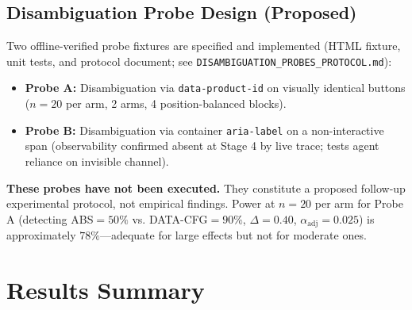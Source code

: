 \documentclass[conference]{IEEEtran}
\begin{document}
\subsection{Disambiguation Probe Design (Proposed)}

Two offline-verified probe fixtures are specified and implemented (HTML fixture, unit tests, and protocol document; see \texttt{DISAMBIGUATION\_PROBES\_PROTOCOL.md}):
\begin{itemize}
    \item \textbf{Probe A:} Disambiguation via \texttt{data-product-id} on visually identical buttons ($n=20$ per arm, 2 arms, 4 position-balanced blocks).
    \item \textbf{Probe B:} Disambiguation via container \texttt{aria-label} on a non-interactive span (observability confirmed absent at Stage 4 by live trace; tests agent reliance on invisible channel).
\end{itemize}
\textbf{These probes have not been executed.} They constitute a proposed follow-up experimental protocol, not empirical findings. Power at $n=20$ per arm for Probe A (detecting ABS$=50\%$ vs. DATA-CFG$=90\%$, $\Delta=0.40$, $\alpha_{\mathrm{adj}}=0.025$) is approximately $78\%$---adequate for large effects but not for moderate ones.

\section{Results Summary}
\label{sec:results}
\end{document}
